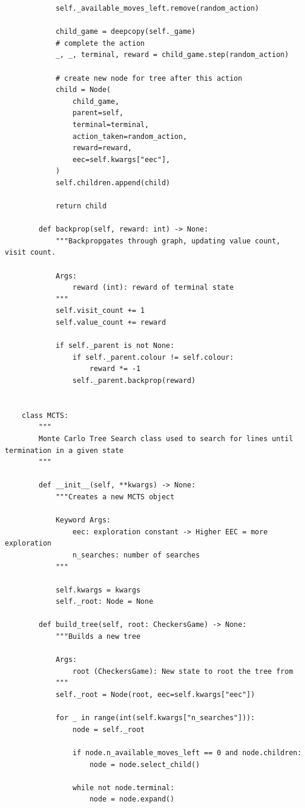 \documentclass{article}
\begin{document}
\begin{verbatim}
            self._available_moves_left.remove(random_action)

            child_game = deepcopy(self._game)
            # complete the action
            _, _, terminal, reward = child_game.step(random_action)

            # create new node for tree after this action
            child = Node(
                child_game,
                parent=self,
                terminal=terminal,
                action_taken=random_action,
                reward=reward,
                eec=self.kwargs["eec"],
            )
            self.children.append(child)

            return child

        def backprop(self, reward: int) -> None:
            """Backpropgates through graph, updating value count, visit count.

            Args:
                reward (int): reward of terminal state
            """
            self.visit_count += 1
            self.value_count += reward

            if self._parent is not None:
                if self._parent.colour != self.colour:
                    reward *= -1
                self._parent.backprop(reward)


    class MCTS:
        """
        Monte Carlo Tree Search class used to search for lines until termination in a given state
        """

        def __init__(self, **kwargs) -> None:
            """Creates a new MCTS object

            Keyword Args:
                eec: exploration constant -> Higher EEC = more exploration
                n_searches: number of searches
            """

            self.kwargs = kwargs
            self._root: Node = None

        def build_tree(self, root: CheckersGame) -> None:
            """Builds a new tree

            Args:
                root (CheckersGame): New state to root the tree from
            """
            self._root = Node(root, eec=self.kwargs["eec"])

            for _ in range(int(self.kwargs["n_searches"])):
                node = self._root

                if node.n_available_moves_left == 0 and node.children:
                    node = node.select_child()

                while not node.terminal:
                    node = node.expand()


\end{verbatim}
\end{document}
